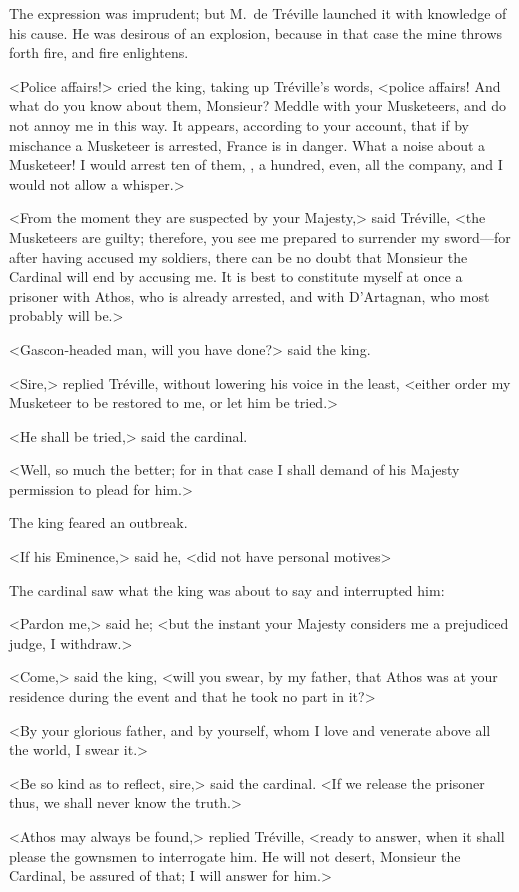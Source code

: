 The expression was imprudent; but M.~de Tréville launched it with knowledge of his cause. He was desirous of an explosion, because in that case the mine throws forth fire, and fire enlightens. 

<Police affairs!> cried the king, taking up Tréville's words, <police affairs! And what do you know about them, Monsieur? Meddle with your Musketeers, and do not annoy me in this way. It appears, according to your account, that if by mischance a Musketeer is arrested, France is in danger. What a noise about a Musketeer! I would arrest ten of them, , a hundred, even, all the company, and I would not allow a whisper.> 

<From the moment they are suspected by your Majesty,> said Tréville, <the Musketeers are guilty; therefore, you see me prepared to surrender my sword—for after having accused my soldiers, there can be no doubt that Monsieur the Cardinal will end by accusing me. It is best to constitute myself at once a prisoner with Athos, who is already arrested, and with D'Artagnan, who most probably will be.> 

<Gascon-headed man, will you have done?> said the king. 

<Sire,> replied Tréville, without lowering his voice in the least, <either order my Musketeer to be restored to me, or let him be tried.> 

<He shall be tried,> said the cardinal. 

<Well, so much the better; for in that case I shall demand of his Majesty permission to plead for him.> 

The king feared an outbreak. 

<If his Eminence,> said he, <did not have personal motives\longdash> 

The cardinal saw what the king was about to say and interrupted him: 

<Pardon me,> said he; <but the instant your Majesty considers me a prejudiced judge, I withdraw.> 

<Come,> said the king, <will you swear, by my father, that Athos was at your residence during the event and that he took no part in it?> 

<By your glorious father, and by yourself, whom I love and venerate above all the world, I swear it.> 

<Be so kind as to reflect, sire,> said the cardinal. <If we release the prisoner thus, we shall never know the truth.> 

<Athos may always be found,> replied Tréville, <ready to answer, when it shall please the gownsmen to interrogate him. He will not desert, Monsieur the Cardinal, be assured of that; I will answer for him.> 

